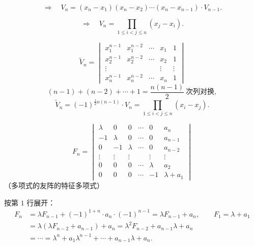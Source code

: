 \[
\Rightarrow\quad V_n=(x_n-x_1)(x_n-x_2)\cdots(x_n-x_{n-1})\cdot V_{n-1}.
\]

\[
\Rightarrow\quad V_n=\prod_{1\le i<j\le n}(x_j-x_i).
\]

\[
\tilde{V}_n=\begin{vmatrix}
x_1^{n-1}&x_1^{n-2}&\cdots&x_1&1\\
x_2^{n-1}&x_2^{n-2}&\cdots&x_2&1\\
\vdots& & &\vdots&\vdots\\
x_n^{n-1}&x_n^{n-2}&\cdots&x_n&1
\end{vmatrix}
\]
\[
(n-1)+(n-2)+\cdots+1=\frac{n(n-1)}{2}\ \text{次列对换},
\]
\[
\tilde{V}_n=(-1)^{\frac{1}{2}n(n-1)}\cdot V_n=\prod_{1\le i<j\le n}(x_i-x_j).
\]

\begin{example}
\[
F_n=\begin{vmatrix}
\lambda&0&0&\cdots&0&a_n\\
-1&\lambda&0&\cdots&0&a_{n-1}\\
0&-1&\lambda&\cdots&0&a_{n-2}\\
\vdots&\vdots&\vdots& &\vdots&\vdots\\
0&0&0&\cdots&\lambda&a_2\\
0&0&0&\cdots&-1&\lambda+a_1
\end{vmatrix}
\]
（多项式的友阵的特征多项式）

按第 $1$ 行展开：
\begin{align*}
F_n&=\lambda F_{n-1}+(-1)^{1+n}\cdot a_n\cdot(-1)^{n-1}=\lambda F_{n-1}+a_n,
\qquad F_1=\lambda+a_1\\
&=\lambda(\lambda F_{n-2}+a_{n-1})+a_n=\lambda^2F_{n-2}+a_{n-1}\lambda+a_n\\
&=\cdots=\lambda^n+a_1\lambda^{n-1}+\cdots+a_{n-1}\lambda+a_n .
\end{align*}
\end{example}


